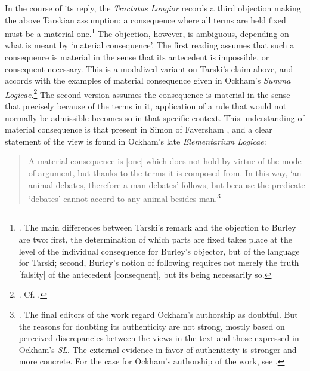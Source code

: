 \documentclass[]{birkjour}
\begin{document}
In the course of its reply, the \textit{Tractatus Longior} records a third objection making the above Tarskian assumption: a consequence where all terms are held fixed must be a material one.\footnote{\autocite[p. 86.4-9]{BurleyDPAL}. The main differences between Tarski's remark and the objection to Burley are two: first, the determination of which parts are fixed takes place at the level of the individual consequence for Burley's objector, but of the language for Tarski; second, Burley's notion of following requires not merely the truth [falsity] of the antecedent [consequent], but its being necessarily so.} The objection, however, is ambiguous, depending on what is meant by `material consequence'. The first reading assumes that such a consequence is material in the sense that its antecedent is impossible, or consequent necessary. This is a modalized variant on Tarski's claim above, and accords with the examples of material consequence given in Ockham's \textit{Summa Logicae}.\footnote{\autocite[III-3. 1, p. 589]{OckhamSL}. Cf. \autocite[p. 7, par. 18; ]{Green-Pedersen1980a}.} The second version assumes the consequence is material in the sense that precisely because of the terms in it, application of a rule that would not normally be admissible becomes so in that specific context. This understanding of material consequence is that present in Simon of Faversham \autocite[q. 36]{FavershamQE}, and a clear statement of the view is found in Ockham's late \textit{Elementarium Logicae}:

\begin{quote}
	A material consequence is [one] which does not hold by virtue of the mode of argument, but thanks to the terms it is composed from. In this way, `an animal debates, therefore a man debates' follows, but because the predicate `debates' cannot accord to any animal besides man.\footnote{\autocite[VI. 4, p. 163]{OckhamEL}. The final editors of the work regard Ockham's authorship as doubtful. But the reasons for doubting its authenticity are not strong, mostly based on perceived discrepancies between the views in the text and those expressed in Ockham's \textit{SL}. The external evidence in favor of authenticity is stronger and more concrete. For the case for Ockham's authorship of the work, see \autocite{Boehner1958b}.}
\end{quote}
\end{document}
